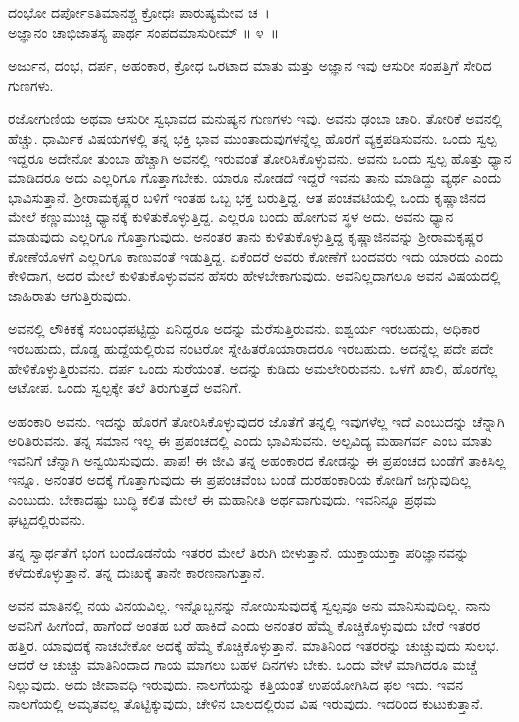 \begin{shloka}
ದಂಭೋ ದರ್ಪೋಽತಿಮಾನಶ್ಚ ಕ್ರೋಧಃ ಪಾರುಷ್ಯಮೇವ ಚ~।\\ಅಜ್ಞಾನಂ ಚಾಭಿಜಾತಸ್ಯ ಪಾರ್ಥ ಸಂಪದಮಾಸುರೀಮ್ \hfill॥ ೪~॥
\end{shloka}

\begin{artha}
ಅರ್ಜುನ, ದಂಭ, ದರ್ಪ, ಅಹಂಕಾರ, ಕ್ರೋಧ ಒರಟಾದ ಮಾತು ಮತ್ತು ಅಜ್ಞಾನ ಇವು ಆಸುರೀ ಸಂಪತ್ತಿಗೆ ಸೇರಿದ ಗುಣಗಳು.
\end{artha}

ರಜೋಗುಣಿಯ ಅಥವಾ ಆಸುರೀ ಸ್ವಭಾವದ ಮನುಷ್ಯನ ಗುಣಗಳು ಇವು. ಅವನು ಢಂಬಾ ಚಾರಿ. ತೋರಿಕೆ ಅವನಲ್ಲಿ ಹೆಚ್ಚು. ಧಾರ್ಮಿಕ ವಿಷಯಗಳಲ್ಲಿ ತನ್ನ ಭಕ್ತಿ ಭಾವ ಮುಂತಾದುವುಗಳನ್ನೆಲ್ಲ ಹೊರಗೆ ವ್ಯಕ್ತಪಡಿಸುವನು. ಒಂದು ಸ್ವಲ್ಪ ಇದ್ದರೂ ಅದೇನೋ ತುಂಬಾ ಹೆಚ್ಚಾಗಿ ಅವನಲ್ಲಿ ಇರುವಂತೆ ತೋರಿಸಿಕೊಳ್ಳುವನು. ಅವನು ಒಂದು ಸ್ವಲ್ಪ ಹೊತ್ತು ಧ್ಯಾನ ಮಾಡಿದರೂ ಅದು ಎಲ್ಲರಿಗೂ ಗೊತ್ತಾಗಬೇಕು. ಯಾರೂ ನೋಡದೆ ಇದ್ದರೆ ಇವನು ತಾನು ಮಾಡಿದ್ದು ವ್ಯರ್ಥ ಎಂದು ಭಾವಿಸುತ್ತಾನೆ. ಶ‍್ರೀರಾಮಕೃಷ್ಣರ ಬಳಿಗೆ ಇಂತಹ ಒಬ್ಬ ಭಕ್ತ ಬರುತ್ತಿದ್ದ. ಆತ ಪಂಚವಟಿಯಲ್ಲಿ ಒಂದು ಕೃಷ್ಣಾಜಿನದ ಮೇಲೆ ಕಣ್ಣುಮುಚ್ಚಿ ಧ್ಯಾನಕ್ಕೆ ಕುಳಿತುಕೊಳ್ಳುತ್ತಿದ್ದ. ಎಲ್ಲರೂ ಬಂದು ಹೋಗುವ ಸ್ಥಳ ಅದು. ಅವನು ಧ್ಯಾನ ಮಾಡುವುದು ಎಲ್ಲರಿಗೂ ಗೊತ್ತಾಗುವುದು. ಅನಂತರ ತಾನು ಕುಳಿತುಕೊಳ್ಳುತ್ತಿದ್ದ ಕೃಷ್ಣಾಜಿನವನ್ನು ಶ‍್ರೀರಾಮಕೃಷ್ಣರ ಕೋಣೆಯೊಳಗೆ ಎಲ್ಲರಿಗೂ ಕಾಣುವಂತೆ ಇಡುತ್ತಿದ್ದ. ಏಕೆಂದರೆ ಅವರು ಕೋಣೆಗೆ ಬಂದವರು ಇದು ಯಾರದು ಎಂದು ಕೇಳಿದಾಗ, ಅದರ ಮೇಲೆ ಕುಳಿತುಕೊಳ್ಳುವವನ ಹೆಸರು ಹೇಳಬೇಕಾಗುವುದು. ಅವನಿಲ್ಲದಾಗಲೂ ಅವನ ವಿಷಯದಲ್ಲಿ ಜಾಹಿರಾತು ಆಗುತ್ತಿರುವುದು.

ಅವನಲ್ಲಿ ಲೌಕಿಕಕ್ಕೆ ಸಂಬಂಧಪಟ್ಟಿದ್ದು ಏನಿದ್ದರೂ ಅದನ್ನು ಮೆರೆಸುತ್ತಿರುವನು. ಐಶ್ವರ್ಯ ಇರಬಹುದು, ಅಧಿಕಾರ ಇರಬಹುದು, ದೊಡ್ಡ ಹುದ್ದೆಯಲ್ಲಿರುವ ನಂಟರೋ ಸ್ನೇಹಿತರೊ\break ಯಾರಾದರೂ ಇರಬಹುದು. ಅದನ್ನೆಲ್ಲ ಪದೇ ಪದೇ ಹೇಳಿಕೊಳ್ಳುತ್ತಿರುವನು. ದರ್ಪ ಒಂದು ಸುರೆಯಂತೆ. ಅದನ್ನು ಕುಡಿದು ಅಮಲೇರಿರುವನು. ಒಳಗೆ ಖಾಲಿ, ಹೊರಗೆಲ್ಲ ಆಟೋಪ. ಒಂದು ಸ್ವಲ್ಪಕ್ಕೇ ತಲೆ ತಿರುಗುತ್ತದೆ ಅವನಿಗೆ.

ಅಹಂಕಾರಿ ಅವನು. ಇದನ್ನು ಹೊರಗೆ ತೋರಿಸಿಕೊಳ್ಳುವುದರ ಜೊತೆಗೆ ತನ್ನಲ್ಲಿ ಇವುಗಳೆಲ್ಲ ಇದೆ ಎಂಬುದನ್ನು ಚೆನ್ನಾಗಿ ಅರಿತಿರುವನು. ತನ್ನ ಸಮಾನ ಇಲ್ಲ ಈ ಪ್ರಪಂಚದಲ್ಲಿ ಎಂದು ಭಾವಿಸುವನು. ಅಲ್ಪವಿದ್ಯ ಮಹಾಗರ್ವ ಎಂಬ ಮಾತು ಇವನಿಗೆ ಚೆನ್ನಾಗಿ ಅನ್ವಯಿಸುವುದು. ಪಾಪ! ಈ ಜೀವಿ ತನ್ನ ಅಹಂಕಾರದ ಕೋಡನ್ನು ಈ ಪ್ರಪಂಚದ ಬಂಡೆಗೆ ತಾಕಿಸಿಲ್ಲ ಇನ್ನೂ. ಅನಂತರ ಅದಕ್ಕೆ ಗೊತ್ತಾಗುವುದು ಈ ಪ್ರಪಂಚವೆಂಬ ಬಂಡೆ ದುರಹಂಕಾರಿಯ ಕೋಡಿಗೆ ಜಗ್ಗುವುದಿಲ್ಲ ಎಂಬುದು. ಬೇಕಾದಷ್ಟು ಬುದ್ಧಿ ಕಲಿತ ಮೇಲೆ ಈ ಮಹಾನೀತಿ ಅರ್ಥವಾಗುವುದು. ಇವನಿನ್ನೂ ಪ್ರಥಮ ಘಟ್ಟದಲ್ಲಿರುವನು.

ತನ್ನ ಸ್ವಾರ್ಥತೆಗೆ ಭಂಗ ಬಂದೊಡನೆಯೆ ಇತರರ ಮೇಲೆ ತಿರುಗಿ ಬೀಳುತ್ತಾನೆ. ಯುಕ್ತಾಯುಕ್ತಾ ಪರಿಜ್ಞಾನವನ್ನು ಕಳೆದುಕೊಳ್ಳುತ್ತಾನೆ. ತನ್ನ ದುಃಖಕ್ಕೆ ತಾನೇ ಕಾರಣನಾಗುತ್ತಾನೆ.

ಅವನ ಮಾತಿನಲ್ಲಿ ನಯ ವಿನಯವಿಲ್ಲ. ಇನ್ನೊಬ್ಬನನ್ನು ನೋಯಿಸುವುದಕ್ಕೆ ಸ್ವಲ್ಪವೂ ಅನು ಮಾನಿಸುವುದಿಲ್ಲ. ನಾನು ಅವನಿಗೆ ಹೀಗೆಂದೆ, ಹಾಗೆಂದೆ ಅಂತಹ ಬರೆ ಹಾಕಿದೆ ಎಂದು ಅನಂತರ ಹೆಮ್ಮೆ ಕೊಚ್ಚಿಕೊಳ್ಳುವುದು ಬೇರೆ ಇತರರ ಹತ್ತಿರ. ಯಾವುದಕ್ಕೆ ನಾಚಬೇಕೋ ಅದಕ್ಕೆ ಹೆಮ್ಮೆ ಕೊಚ್ಚಿಕೊಳ್ಳುತ್ತಾನೆ. ಮಾತಿನಿಂದ ಇತರರನ್ನು ಚುಚ್ಚುವುದು ಸುಲಭ. ಆದರೆ ಆ ಚುಚ್ಚು ಮಾತಿನಿಂದಾದ ಗಾಯ ಮಾಗಲು ಬಹಳ ದಿನಗಳು ಬೇಕು. ಒಂದು ವೇಳೆ ಮಾಗಿದರೂ ಮಚ್ಚೆ ನಿಲ್ಲುವುದು. ಅದು ಜೀವಾವಧಿ ಇರುವುದು. ನಾಲಗೆಯನ್ನು ಕತ್ತಿಯಂತೆ ಉಪಯೋಗಿಸಿದ ಫಲ ಇದು. ಇವನ ನಾಲಗೆಯಲ್ಲಿ ಅಮೃತವಲ್ಲ ತೊಟ್ಟಿಕ್ಕುವುದು, ಚೇಳಿನ ಬಾಲದಲ್ಲಿರುವ ವಿಷ ಇರುವುದು. ಇದರಿಂದ ಕುಟುಕುತ್ತಾನೆ.

